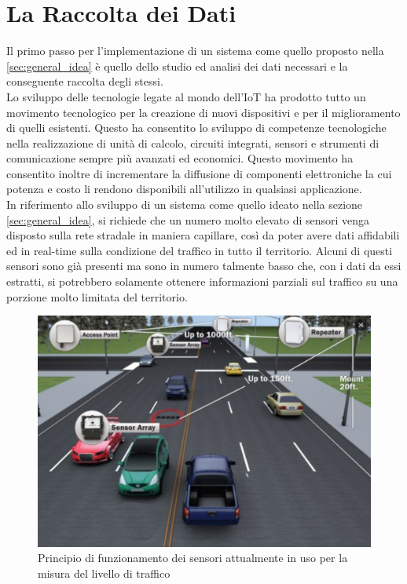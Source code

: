 \section{La Raccolta dei Dati}
Il primo passo per l'implementazione di un sistema come quello proposto nella \autoref{sec:general_idea} è quello dello studio ed analisi dei dati necessari e la conseguente raccolta degli stessi. \\
Lo sviluppo delle tecnologie legate al mondo dell'IoT ha prodotto tutto un movimento tecnologico per la creazione di nuovi dispositivi e per il miglioramento di quelli esistenti. Questo ha consentito lo sviluppo di competenze tecnologiche nella realizzazione di unità di calcolo, circuiti integrati, sensori e strumenti di comunicazione sempre più avanzati ed economici. Questo movimento ha consentito inoltre di incrementare la diffusione di componenti elettroniche la cui potenza e costo li rendono disponibili all'utilizzo in qualsiasi applicazione. \\
In riferimento allo sviluppo di un sistema come quello ideato nella sezione \autoref{sec:general_idea}, si richiede che un numero molto elevato di sensori venga disposto sulla rete stradale in maniera capillare, così da poter avere dati affidabili ed in real-time sulla condizione del traffico in tutto il territorio. Alcuni di questi sensori sono già presenti ma sono in numero talmente basso che, con i dati da essi estratti, si potrebbero solamente ottenere informazioni parziali sul traffico su una porzione molto limitata del territorio.
\begin{figure}
	\begin{center}
		\includegraphics[width=0.7\columnwidth]{images/traffic_sensor}
	\end{center}
	\caption{Principio di funzionamento dei sensori attualmente in uso per la misura del livello di traffico}
	\label{fig:traffic_sensors}
\end{figure}
